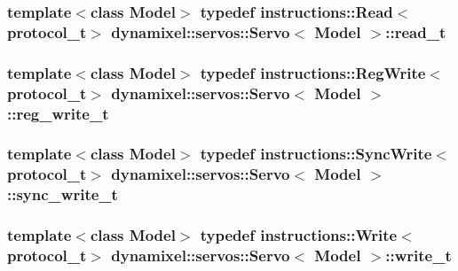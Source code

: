\subsubsection[{read\+\_\+t}]{\setlength{\rightskip}{0pt plus 5cm}template$<$class Model$>$ typedef {\bf instructions\+::\+Read}$<${\bf protocol\+\_\+t}$>$ {\bf dynamixel\+::servos\+::\+Servo}$<$ Model $>$\+::{\bf read\+\_\+t}}\label{classdynamixel_1_1servos_1_1_servo_a456a730b825adc0b7b295f567cf2947b}
\hypertarget{classdynamixel_1_1servos_1_1_servo_adb8219ecc5a368a3222cf30cd17bb882}{}
\subsubsection[{reg\+\_\+write\+\_\+t}]{\setlength{\rightskip}{0pt plus 5cm}template$<$class Model$>$ typedef {\bf instructions\+::\+Reg\+Write}$<${\bf protocol\+\_\+t}$>$ {\bf dynamixel\+::servos\+::\+Servo}$<$ Model $>$\+::{\bf reg\+\_\+write\+\_\+t}}\label{classdynamixel_1_1servos_1_1_servo_adb8219ecc5a368a3222cf30cd17bb882}
\hypertarget{classdynamixel_1_1servos_1_1_servo_aba1cb665a7f6abd9ba15f10f9264d9c8}{}
\subsubsection[{sync\+\_\+write\+\_\+t}]{\setlength{\rightskip}{0pt plus 5cm}template$<$class Model$>$ typedef {\bf instructions\+::\+Sync\+Write}$<${\bf protocol\+\_\+t}$>$ {\bf dynamixel\+::servos\+::\+Servo}$<$ Model $>$\+::{\bf sync\+\_\+write\+\_\+t}}\label{classdynamixel_1_1servos_1_1_servo_aba1cb665a7f6abd9ba15f10f9264d9c8}
\hypertarget{classdynamixel_1_1servos_1_1_servo_a4d005c64809a7c1ddf3817ca55ef03c2}{}
\subsubsection[{write\+\_\+t}]{\setlength{\rightskip}{0pt plus 5cm}template$<$class Model$>$ typedef {\bf instructions\+::\+Write}$<${\bf protocol\+\_\+t}$>$ {\bf dynamixel\+::servos\+::\+Servo}$<$ Model $>$\+::{\bf write\+\_\+t}}\label{classdynamixel_1_1servos_1_1_servo_a4d005c64809a7c1ddf3817ca55ef03c2}


